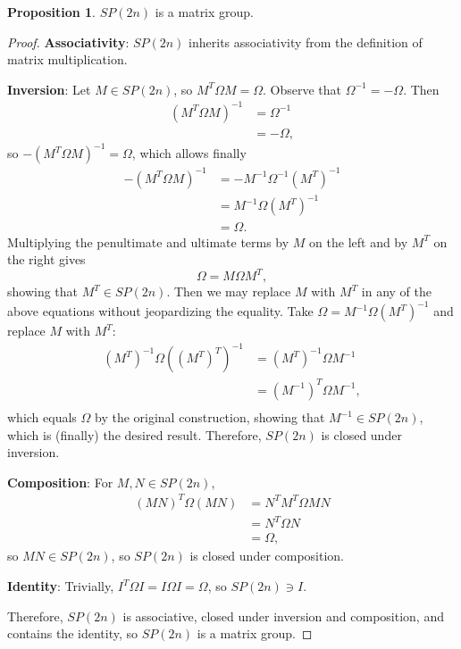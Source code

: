 \documentclass[12pt]{article}
\newcommand{\Om}{\Omega}
\theoremstyle{definition}
\newtheorem{prop}[them]{Proposition}
\theoremstyle{definition}
\theoremstyle{definition}
\theoremstyle{definition}
\theoremstyle{definition}
\theoremstyle{definition}
\theoremstyle{definition}
\theoremstyle{definition}
\begin{document}
\begin{prop}$SP(2n)$ is a matrix group.\end{prop}
\begin{proof}
\par{\textbf{Associativity}: $SP(2n)$ inherits associativity from the definition of matrix multiplication.}

\par{\textbf{Inversion}: Let $M \in SP(2n)$, so $M^T \Om M = \Om$.
Observe that $\Om^{-1} = -\Om$. Then 
\[
\begin{aligned}
    {(M^T \Om M)}^{-1} & = \Om^{-1} \\ 
    & = -\Om,
\end{aligned}
\] 
so $-{(M^T \Om
M)}^{-1} = \Om$, which allows finally
\[
\begin{aligned}
    -{(M^T \Om M)}^{-1} & = -M^{-1} \Om^{-1} {(M^T)}^{-1} \\ 
    & = M^{-1} \Om {(M^T)}^{-1} \\
    & = \Om.
\end{aligned}
\] 
Multiplying the penultimate and ultimate terms by $M$ on the left and by $M^T$ on the right gives
\[
\Om = M \Om M^T,
\] 
showing that $M^T \in SP(2n)$. Then we may replace $M$ with $M^T$ in any of the above equations without jeopardizing the equality. Take $\Om = M^{-1}\Om{(M^T)}^{-1}$ and replace $M$ with $M^T$:
\[
\begin{aligned}
    {(M^T)}^{-1} \Om {({(M^T)}^T)}^{-1} & = {(M^T)}^{-1} \Om M^{-1} \\
    & = {(M^{-1})}^T \Om M^{-1}, \\ 
\end{aligned}
\] 
which equals $\Om$ by the original construction,
showing that $M^{-1} \in SP(2n)$, which is
(finally) the desired result. Therefore, $SP(2n)$
is closed under inversion.}

\par{\textbf{Composition}: For $M, N \in SP(2n)$,
\[
\begin{aligned} 
    {(MN)}^T \Om (MN) & = N^T M^T \Om M N \\ 
    & = N^T \Om N \\ 
    & = \Om,
\end{aligned}
\] 
so $MN \in SP(2n)$, so $SP(2n)$ is closed under
composition. }

\par{\textbf{Identity}: Trivially, $I^T\Om I = I \Om I =  \Om$, so $SP(2n) \ni I$.}

\par{Therefore, $SP(2n)$ is associative, closed under inversion and composition, and contains the identity, so $SP(2n)$ is a matrix group.}
\end{proof}
\end{document}
